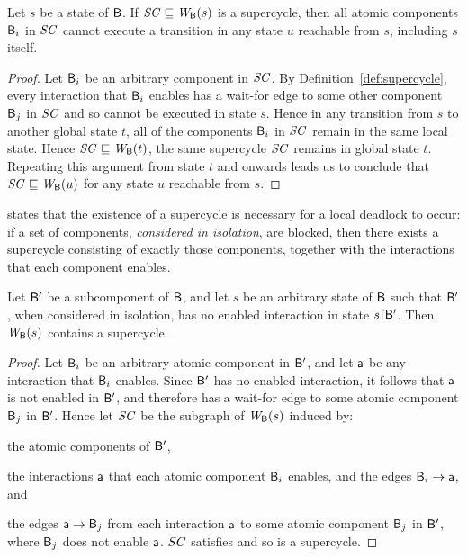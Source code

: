 \begin{proposition}
\label{prop:static:supercycle-is-sufficient}
Let $s$ be a state of $\mathsf{B}$.
If $\mathit{SC} \sqsubseteq \mathit{W}_{\mathsf{B}}({s})$ is a supercycle, then all atomic components $\mathsf{B}_i$ in $\mathit{SC}$ cannot execute a transition in any state $u$ reachable
from $s$, including $s$ itself.
\end{proposition}
%
\begin{proof}
Let $\mathsf{B}_i$ be an arbitrary component in $\mathit{SC}$. By Definition~\ref{def:supercycle}, every interaction that $\mathsf{B}_i$ enables
has a wait-for edge to some other component $\mathsf{B}_j$ in $\mathit{SC}$ and so cannot be executed in state $s$. Hence in any
transition from $s$ to another global state $t$, all of the components $\mathsf{B}_i$ in $\mathit{SC}$ remain in the same local state. 
Hence $\mathit{SC} \sqsubseteq \mathit{W}_{\mathsf{B}}({t})$, \ie the same supercycle $\mathit{SC}$ remains in global state $t$. Repeating this argument from state $t$
and onwards leads us to conclude that $\mathit{SC} \sqsubseteq \mathit{W}_{\mathsf{B}}({u})$ for any state $u$ reachable from $s$.
\end{proof}

 states that the existence of a supercycle is necessary for a local deadlock to occur: if a set of components,
\emph{considered in isolation}, are blocked, then there exists a supercycle consisting of exactly those components, together with the interactions
that each component enables.
%
\begin{proposition}
\label{prop:static:supercycle-is-necessary} 
\label{prop:supercycle-is-necessary}
Let $\mathsf{B}'$ be a subcomponent of $\mathsf{B}$, and let $s$ be an arbitrary state of $\mathsf{B}$ such that $\mathsf{B}'$, when considered in isolation, has no enabled
interaction in state $s \pj \B'$.
%
Then, $\mathit{W}_{\mathsf{B}}({s})$ contains a supercycle.
\end{proposition}
%
\begin{proof}
Let $\mathsf{B}_i$ be an arbitrary atomic component in $\mathsf{B}'$, and let $\mathsf{a}$ be any interaction that $\mathsf{B}_i$ enables. Since $\mathsf{B}'$ has no
enabled interaction, it follows that $\mathsf{a}$ is not enabled in $\mathsf{B}'$, and
therefore has a wait-for edge to some atomic component $\mathsf{B}_j$ in
$\mathsf{B}'$. Hence let $\mathit{SC}$ be the subgraph of $\mathit{W}_{\mathsf{B}}({s})$ induced by:
\bn
\item the atomic components of $\mathsf{B}'$, 
\item the interactions $\mathsf{a}$ that each atomic component $\mathsf{B}_i$ enables,
     and the edges $\mathsf{B}_i \rightarrow \mathsf{a}$, and
\item  the edges $\mathsf{a} \rightarrow \mathsf{B}_j$ from each interaction $\mathsf{a}$ to some atomic
     component $\mathsf{B}_j$ in $\mathsf{B}'$, where $\mathsf{B}_j$ does not enable $\mathsf{a}$.
\en
$\mathit{SC}$ satisfies  and so is a supercycle.
\end{proof}


